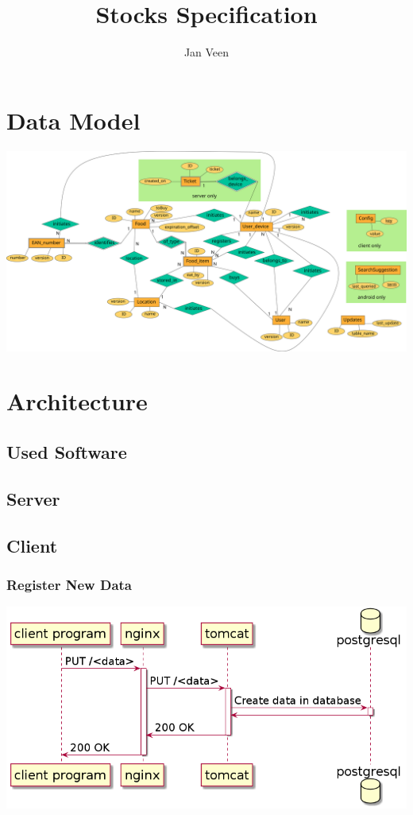 \documentclass[12pt]{report}
\begin{document}
\title{Stocks Specification}			%
\author{Jan Veen}
\maketitle				%
\cleardoublepage
{}
\tableofcontents

\chapter{Data Model}

\includegraphics[width=\linewidth]{diagrams/ER-diagram.png}

\chapter{Architecture}

\section{Used Software}

\section{Server}

\section{Client}

\subsection{Register New Data}

\includegraphics[width=\linewidth]{diagrams/put-data.png}
\end{document}
